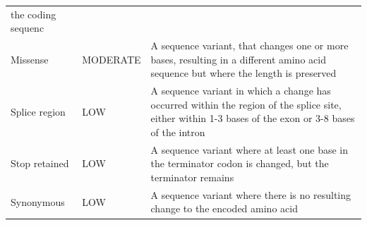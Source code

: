 \documentclass[12pt,twoside]{reedthesis}
\theoremstyle{definition}
\theoremstyle{definition}
\theoremstyle{remark}
\begin{document}
\begin{longtable}[]{@{}lll@{}}
\begin{minipage}[t]{0.63\columnwidth}
  the coding sequenc\strut
  \end{minipage}\tabularnewline
  \begin{minipage}[t]{0.18\columnwidth}\raggedright\strut
  Missense\strut
  \end{minipage} & \begin{minipage}[t]{0.11\columnwidth}\raggedright\strut
  MODERATE\strut
  \end{minipage} & \begin{minipage}[t]{0.63\columnwidth}\raggedright\strut
  A sequence variant, that changes one or more bases, resulting in a
  different amino acid sequence but where the length is preserved\strut
  \end{minipage}\tabularnewline
  \begin{minipage}[t]{0.18\columnwidth}\raggedright\strut
  Splice region\strut
  \end{minipage} & \begin{minipage}[t]{0.11\columnwidth}\raggedright\strut
  LOW\strut
  \end{minipage} & \begin{minipage}[t]{0.63\columnwidth}\raggedright\strut
  A sequence variant in which a change has occurred within the region of
  the splice site, either within 1-3 bases of the exon or 3-8 bases of the
  intron\strut
  \end{minipage}\tabularnewline
  \begin{minipage}[t]{0.18\columnwidth}\raggedright\strut
  Stop retained\strut
  \end{minipage} & \begin{minipage}[t]{0.11\columnwidth}\raggedright\strut
  LOW\strut
  \end{minipage} & \begin{minipage}[t]{0.63\columnwidth}\raggedright\strut
  A sequence variant where at least one base in the terminator codon is
  changed, but the terminator remains\strut
  \end{minipage}\tabularnewline
  \begin{minipage}[t]{0.18\columnwidth}\raggedright\strut
  Synonymous\strut
  \end{minipage} & \begin{minipage}[t]{0.11\columnwidth}\raggedright\strut
  LOW\strut
  \end{minipage} & \begin{minipage}[t]{0.63\columnwidth}\raggedright\strut
  A sequence variant where there is no resulting change to the encoded
  amino acid\strut
  \end{minipage}\tabularnewline

\end{longtable}
\end{document}
